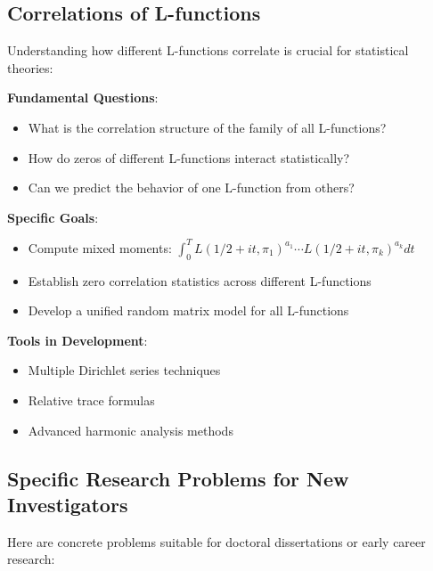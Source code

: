 \subsection{Correlations of L-functions}
\label{subsec:l_function_correlations}

Understanding how different L-functions correlate is crucial for statistical theories:

\begin{research_problem}
\textbf{Fundamental Questions}:
\begin{itemize}
\item What is the correlation structure of the family of all L-functions?
\item How do zeros of different L-functions interact statistically?
\item Can we predict the behavior of one L-function from others?
\end{itemize}

\textbf{Specific Goals}:
\begin{itemize}
\item Compute mixed moments: $\int_0^T L(1/2 + it, \pi_1)^{a_1} \cdots L(1/2 + it, \pi_k)^{a_k} dt$
\item Establish zero correlation statistics across different L-functions
\item Develop a unified random matrix model for all L-functions
\end{itemize}

\textbf{Tools in Development}:
\begin{itemize}
\item Multiple Dirichlet series techniques
\item Relative trace formulas
\item Advanced harmonic analysis methods
\end{itemize}
\end{research_problem}

\subsection{Specific Research Problems for New Investigators}
\label{subsec:specific_problems}

Here are concrete problems suitable for doctoral dissertations or early career research:


